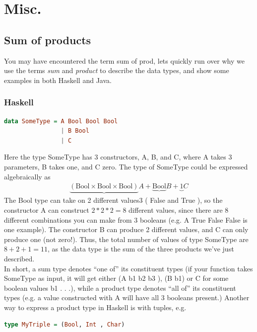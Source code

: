 \documentclass{article}
\begin{document}
    \section{Misc.}
        \subsection{Sum of products}
            You may have encountered the term \gls{sum of prod}, lets quickly run over why we use the terms \textit{sum} and \textit{product} 
            to describe the data types, and show some examples in both Haskell and Java.
            \subsubsection*{Haskell}
            \begin{lstlisting}[language=Haskell]
data SomeType = A Bool Bool Bool
                | B Bool
                | C
            \end{lstlisting}
            Here the type SomeType has 3 constructors, A, B, and C, where A takes 3 parameters, B takes one, and C zero. 
            The type of SomeType could be expressed algebraically as
            \begin{align*}
                \underbrace{(\text{Bool} \times \text{Bool} \times \text{Bool})}{A} + \underbrace{\text{Bool}}{B} + \underbrace{1}{C}
            \end{align*}
            The Bool type can take on 2 different values3
            ( False and True ), so the constructor A
            can construct $2 * 2 * 2 = 8$ different values, since there are 8 different combinations you can
            make from 3 booleans (e.g. A True False False is one example). The constructor B can
            produce 2 different values, and C can only produce one (not zero!).
            Thus, the total number of values of type SomeType are $8 + 2 + 1 = 11$, as the data type
            is the sum of the three products we've just described.\\
            In short, a sum type denotes “one of” its constituent types (if your function takes SomeType
            as input, it will get either (A b1 b2 b3 ), (B b1) or C for some boolean values b1 . . .), while
            a product type denotes “all of” its constituent types (e.g. a value constructed with A will
            have all 3 booleans present.) Another way to express a product type in Haskell is with tuples,
            e.g.
            \begin{lstlisting}[language=Haskell]
type MyTriple = (Bool, Int , Char)
            \end{lstlisting}
\end{document}
